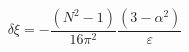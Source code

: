 \begin{equation}  \label{d5}
\delta\xi=-\frac{\left(N^{2}-1\right)}{16\pi^{2}}\frac{\left(3-\alpha^{2}%
\right)}{\varepsilon}
\end{equation}

